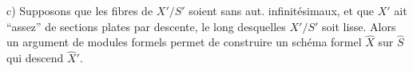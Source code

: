 c) Supposons  que les fibres de $X'/S'$ soient sans aut. infinitésimaux, et que $X'$  ait  ``assez'' de sections   plates par descente, le long desquelles $X'/S'$ soit lisse. Alors un argument de modules formels permet de construire un schéma formel $\widehat X$ sur $\widehat S$ qui descend $\widehat X'$.



